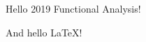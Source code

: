 \documentclass{ctexart}
\begin{document}
    Hello 2019 Functional Analysis!

    And hello \LaTeX!
\end{document}
